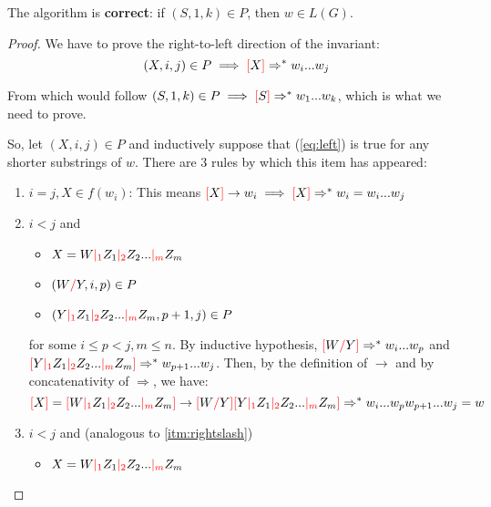 \documentclass[main.tex]{subfiles}
\begin{document}
\begin{prop}
    The algorithm is \textbf{correct}: if $(S, 1, k) \in P$, then $w \in L(G)$.
\end{prop}
\begin{proof}
    We have to prove the right-to-left direction of the invariant:
    \begin{equation}\label{eq:left}
        (X, i, j) \in P \implies \textcolor{red}{[} X \textcolor{red}{]} \Rightarrow^* w_i ... w_j
    \end{equation}

    From which would follow $ (S, 1, k) \in P \implies \textcolor{red}{[} S \textcolor{red}{]} \Rightarrow^* w_1 ... w_k$,
    which is what we need to prove.

    So, let $(X, i, j) \in P$ and inductively suppose that (\ref{eq:left}) is true
    for any shorter substrings of $w$. There are 3 rules by which this item has appeared:
    \begin{enumerate}
        \item $i = j, X \in f(w_i)$: This means
            $\textcolor{red}{[} X \textcolor{red}{]} \rightarrow w_i \implies \textcolor{red}{[} X \textcolor{red}{]} \Rightarrow^* w_i = w_i ... w_j$
        \item \label{itm:rightslash} $i < j$ and
            \begin{itemize}
                \item $X = W \textcolor{red}{|_{1}} Z_1 \textcolor{red}{|_{2}} Z_2 ... \textcolor{red}{|_{m}} Z_m$
                \item $(W \textcolor{red}{/} Y, i, p) \in P$
                \item $(Y \textcolor{red}{|_{1}} Z_1 \textcolor{red}{|_{2}} Z_2 ... \textcolor{red}{|_{m}} Z_m, p + 1, j) \in P$
            \end{itemize}
            for some $i \leq p < j, m \leq n$. By inductive hypothesis,
            $\textcolor{red}{[} W \textcolor{red}{/} Y \textcolor{red}{]} \Rightarrow^* w_i ... w_p$
            and
            $\textcolor{red}{[} Y \textcolor{red}{|_{1}} Z_1 \textcolor{red}{|_{2}} Z_2 ... \textcolor{red}{|_{m}} Z_m \textcolor{red}{]} \Rightarrow^* w_{p + 1} ... w_j$.
            Then, by the definition of $\rightarrow$ and by concatenativity of
            $\Rightarrow$, we have:
            \[
                \textcolor{red}{[} X \textcolor{red}{]} = \textcolor{red}{[} W \textcolor{red}{|_{1}} Z_1 \textcolor{red}{|_{2}} Z_2 ... \textcolor{red}{|_{m}} Z_m \textcolor{red}{]}
                \rightarrow
                \textcolor{red}{[} W \textcolor{red}{/} Y \textcolor{red}{]} \textcolor{red}{[} Y \textcolor{red}{|_{1}} Z_1 \textcolor{red}{|_{2}} Z_2 ... \textcolor{red}{|_{m}} Z_m \textcolor{red}{]}
                \Rightarrow^*
                w_i ... w_p w_{p + 1} ... w_j = w
            \]
        \item $i < j$ and (analogous to \ref{itm:rightslash})
            \begin{itemize}
                \item $X = W \textcolor{red}{|_{1}} Z_1 \textcolor{red}{|_{2}} Z_2 ... \textcolor{red}{|_{m}} Z_m$

\end{itemize}
\end{enumerate}
\end{proof}
\end{document}
